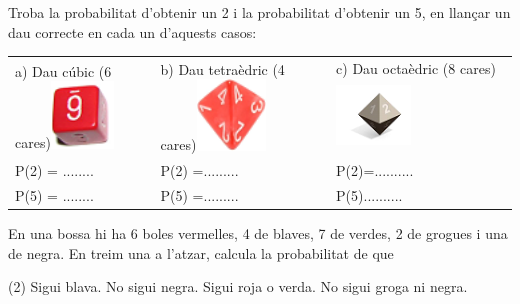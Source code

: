 \pagebreak
 \begin{mylist}

\exer \spen  Troba la probabilitat d'obtenir un 2 i la probabilitat d'obtenir un 5, en llançar un dau correcte en cada un d'aquests casos:

\begin{longtable}{p{1.5in}p{1.2in}p{1.2in}} 
	\centering 
a) Dau cúbic (6 cares)\newline \includegraphics*[bb=0 0 0.66in 0.70in, width=0.66in, height=0.70in, keepaspectratio=false]{img-04/image3.png} & b) Dau tetraèdric (4 cares)\newline \includegraphics*[bb=0 0 0.73in 0.74in, width=0.73in, height=0.74in, keepaspectratio=false]{img-04/image4.png} & c) Dau octaèdric (8 cares)\newline \includegraphics*[bb=0 0 1.13in 0.89in, width=0.78in, height=0.76in, keepaspectratio=false, trim=0.31in 0.04in 0.04in 0.09in]{img-04/image5.png} \\ [0.5cm] \quad P(2) = ........ & \quad P(2) =......... & \quad P(2)=.......... \\  [0.2cm] \quad P(5) = ........ & \quad P(5) =......... & \quad P(5).......... \\
\end{longtable}

\answers{[$P(2)=\frac{1}{6}$; $P(5)=\frac{1}{6}$,  $P(2)=\frac{1}{4}$; $P(5)=0$,  $P(2)=\frac{1}{8}$; $P(5)=\frac{1}{8}$]}


  \exer \spen En una bossa hi ha 6 boles vermelles, 4 de blaves, 7 de verdes, 2 de grogues i una de negra. En treim una a l'atzar, calcula la probabilitat de que
\begin{tasks}(2)
	\task  Sigui blava.    
	\task  No sigui negra.
	\task  Sigui roja o verda.   
	\task  No sigui groga ni negra.
\end{tasks}
 


\end{mylist}

